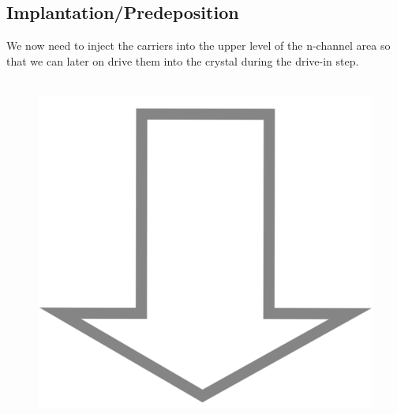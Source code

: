 \newpage

\subsection{Implantation/Predeposition}\label{nwell_implant_step}
We now need to inject the carriers into the upper level of the n-channel area so that we can later on drive them into the crystal during the drive-in step.

\begin{figure}[H]
	\centering
	\begin{tikzpicture}[node distance = 3cm, auto, thick,scale=\CrossSectionOnly, every node/.style={transform shape}]
		
	\end{tikzpicture} \\
	\includegraphics[scale=0.01]{down_arrow.png} \\
	\begin{tikzpicture}[node distance = 3cm, auto, thick,scale=\CrossSectionOnly, every node/.style={transform shape}]
		
	\end{tikzpicture} \\

\end{figure}
